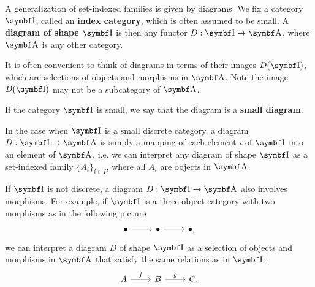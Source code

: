 \begin{definition}\label{def:categorical_diagram}
  A generalization of set-indexed families is given by diagrams. We fix a category \( \Bold I \), called an \textbf{index category}, which is often assumed to be small. A \textbf{diagram of shape \( \Bold I \)} is then any functor \( D: \Bold I \to \Bold A \), where \( \Bold A \) is any other category.

  It is often convenient to think of diagrams in terms of their images \( D(\Bold I) \), which are selections of objects and morphisms in \( \Bold A \). Note the image \( D(\Bold I) \) may not be a subcategory of \( \Bold A \).

  If the category \( \Bold I \) is small, we say that the diagram is a \textbf{small diagram}.
\end{definition}

\begin{example}\label{ex:categorical_diagrams}
  \mbox{}
  \begin{defenum}
    \item In the case when \( \Bold I \) is a small discrete category, a diagram \( D: \Bold I \to \Bold A \) is simply a mapping of each element \( i \) of \( \Bold I \) into an element of \( \Bold A \), i.e. we can interpret any diagram of shape \( \Bold I \) as a set-indexed family \( \{ A_i \}_{i \in I} \), where all \( A_i \) are objects in \( \Bold A \).

    \item If \( \Bold I \) is not discrete, a diagram \( D: \Bold I \to \Bold A \) also involves morphisms. For example, if \( \Bold I \) is a three-object category with two morphisms as in the following picture
    \begin{equation*}
      \begin{tikzcd}
        \bullet \arrow[r] & \bullet \arrow[r] & \bullet,
      \end{tikzcd}
    \end{equation*}
    we can interpret a diagram \( D \) of shape \( \Bold I \) as a selection of objects and morphisms in \( \Bold A \) that satisfy the same relations as in \( \Bold I \):
    \begin{equation*}
      \begin{tikzcd}
        A \arrow[r, "f"] & B \arrow[r, "g"] & C.
      \end{tikzcd}
    \end{equation*}
  \end{defenum}
\end{example}

